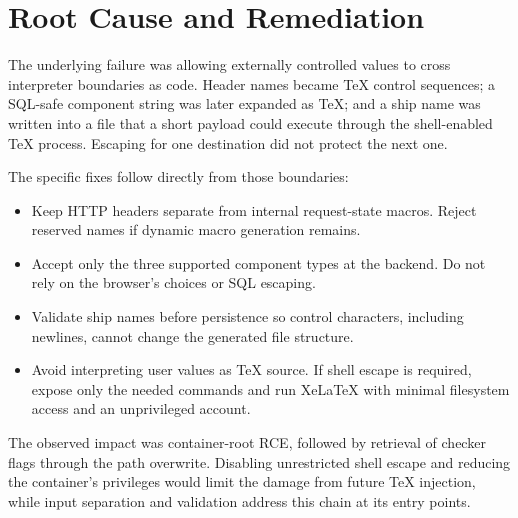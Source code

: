\section{Root Cause and Remediation}
\label{sec:lessons}

The underlying failure was allowing externally controlled values to cross
interpreter boundaries as code. Header names became TeX control sequences;
a SQL-safe component string was later expanded as TeX; and a ship name
was written into a file that a short payload could execute through the
shell-enabled TeX process. Escaping for one destination did not protect
the next one.

The specific fixes follow directly from those boundaries:

\begin{itemize}
  \item Keep HTTP headers separate from internal request-state macros.
        Reject reserved names if dynamic macro generation remains.
  \item Accept only the three supported component types at the backend.
        Do not rely on the browser's choices or SQL escaping.
  \item Validate ship names before persistence so control characters,
        including newlines, cannot change the generated file structure.
  \item Avoid interpreting user values as TeX source. If shell escape is
        required, expose only the needed commands and run XeLaTeX with
        minimal filesystem access and an unprivileged account.
\end{itemize}

The observed impact was container-root RCE, followed by retrieval of
checker flags through the path overwrite. Disabling unrestricted shell
escape and reducing the container's privileges would limit the damage
from future TeX injection, while input separation and validation address
this chain at its entry points.
